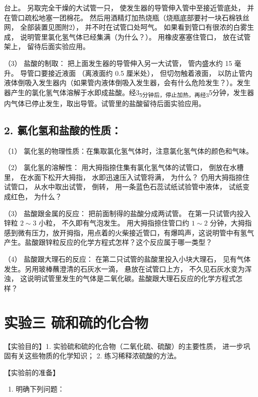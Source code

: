 台上。 另取完全干燥的大试管一只， 使发生器的导管伸入管中至接近管底处，
并在管口疏松地塞一团棉花。
然后用酒精灯加热烧瓶（烧瓶底部要衬一块石棉铁丝网， 全部装置见图附2），
并不时在试管口处呵气。 如果看到管口有很浓的白雾生成，
说明管里氯化氢气体已经集满（为什么？）。 用橡皮塞塞住管口，
放在试管架上， 留待后面实验应用。

（3） 盐酸的制取： 把上面发生器的导管伸入另一大试管， 管内盛水约 15
毫升。 导管口要接近液面 （离液面约 0.5 厘米处）， 但切勿触着液面，
以防止管内液体倒吸入发生器内（如果管内液体倒吸入发生器，会有什么危险发生？）。发生器产生的氯化氢气体溶解于水即成盐酸。经3\textsubscript{5分钟后，停止加热，再经3}5分钟，发生器内气体已停止发生，取出导管。试管里的盐酸留待后面实验应用。

\subsection{2. 氯化氢和盐酸的性质：}

（1） 氯化氢的物理性质：在集取氯化氢气体时，注意氯化氢气体的颜色和气味。

（2） 氯化氢的溶解性： 用大拇指捺住集有氯化氢气体的试管口，
倒放在水槽里， 在水面下松开大拇指， 水即迅速压入试管将满， 为什么？
仍用大拇指捺住试管口， 从水中取出试管， 倒转，
用一条蓝色石蕊试纸试验管中液体， 试纸变成红色， 为什么？

（3） 盐酸跟金属的反应： 把前面制得的盐酸分成两试管。
在第一只试管内投入锌粒 \(2 \sim 3\) 小粒， 不久即有气泡发生。
用大拇指捺住管口约 \(1 \sim 2\)
分钟，大拇指感到微有压力，放开拇指，用点着的火柴接近管口，有爆鸣声，这说明管中有氢气产生。盐酸跟锌粒反应的化学方程式怎样？这个反应属于哪一类型？

（4） 盐酸跟大理石的反应： 在第二只试管的盐酸里投入小块大理石，
见有气体发生。另用玻棒蘸澄清的石灰水一滴， 悬放在试管口上方，
不久见石灰水变为浑浊，
这说明试管里发生的气体是二氧化碳。盐酸跟大理石反应的化学方程式怎样？

\section{实验三 硫和硫的化合物}

【实验目的】1. 实验硫和硫的化合物（二氧化硫、硫酸）的主要性质，
进一步巩固有关这些物质的化学知识； 2. 练习稀释浓硫酸的方法。

【实验前的准备】

\begin{enumerate}
\item
  明确下列问题：
\end{enumerate}

